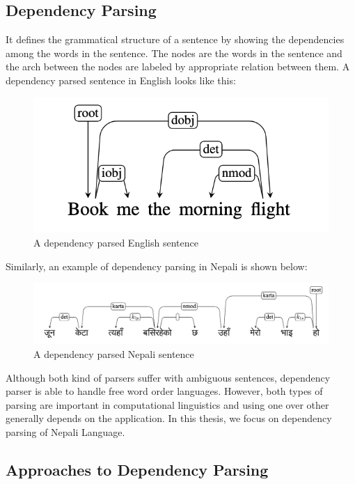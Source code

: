 \subsection{Dependency Parsing}
        It defines the grammatical structure of a sentence by showing the
        dependencies among the words in the sentence. The nodes are the words
        in the sentence and the arch between the nodes are labeled by
        appropriate relation between them. A dependency parsed sentence in English looks like this:
    \begin{figure}[!h]
        \center
        \includegraphics[scale=0.2]{images/dep_tree_eng_example}
        \caption{A dependency parsed English sentence\cite{stanfordLec}}
        \label{fig:dep_example}
    \end{figure}
    \newline
    Similarly, an example of dependency parsing in Nepali is shown below:
    \begin{figure}[!h]
        \center
        \includegraphics[scale=0.2]{images/dep_tree_example}
        \caption{A dependency parsed Nepali sentence\cite{yajnik1}}
        \label{fig:dep_example_eng}
    \end{figure}
Although both kind of parsers suffer with ambiguous sentences, dependency
parser is able to handle free word order languages. However, both types of
parsing are important in computational linguistics and using one over other
generally depends on the application. In this thesis, we focus on dependency
parsing of Nepali Language.

\subsection{Approaches to Dependency Parsing}
